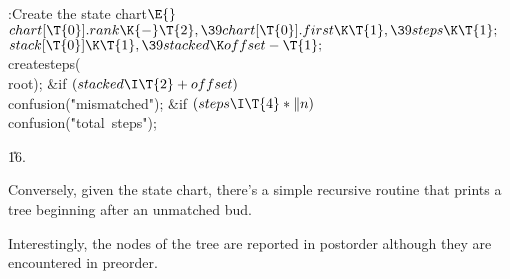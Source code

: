 \B{}:Create the state chart\X${}\E{}$\6
$\\{chart}[\T{0}].\\{rank}\K{-}\T{2},\39\\{chart}[\T{0}].\\{first}\K\T{1},\39%
\\{steps}\K\T{1};{}$\6
${}\\{stack}[\T{0}]\K\T{1},\39\\{stacked}\K\\{offset}-\T{1};{}$\6
\\{createsteps}(\\{root});\6
\&{if} ${}(\\{stacked}\I\T{2}+\\{offset}){}$\1\5
\\{confusion}(\.{"mismatched"});\2\6
\&{if} ${}(\\{steps}\I\T{4}*\|n){}$\1\5
\\{confusion}(\.{"total\ steps"});\2\par
\U16.\fi

Conversely, given the state chart, there's a simple recursive routine
that prints a tree beginning after an unmatched bud.

Interestingly, the nodes of the tree are reported in postorder although
they are encountered in preorder.

